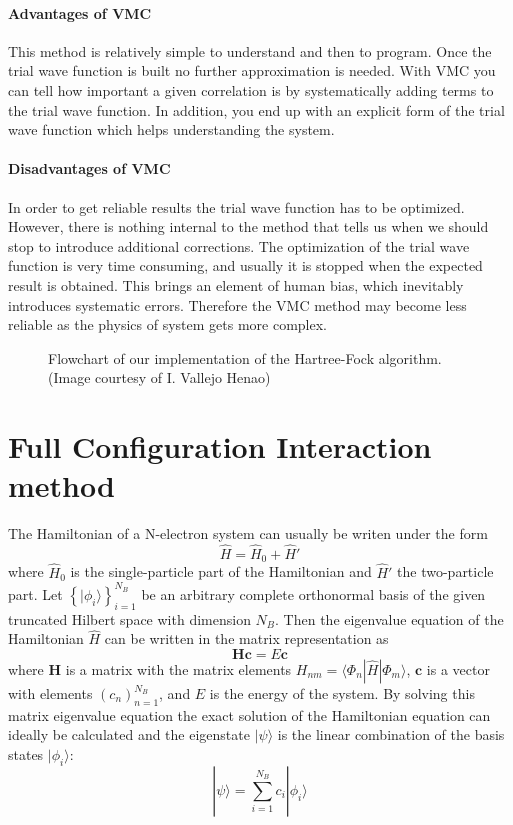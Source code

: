 \paragraph{Advantages of VMC}
This method is relatively simple to understand and then to program. Once the trial wave function is built no further approximation is needed.
With VMC you can tell how important a given correlation is by systematically adding terms to the trial wave function.
In addition, you end up with an explicit form of the trial wave function which helps understanding the system.

\paragraph{Disadvantages of VMC}
In order to get reliable results the trial wave function has to be optimized. However, there is nothing internal to the method that tells us when we should stop to introduce additional corrections.
The optimization of the trial wave function is very time consuming, and usually it is stopped when the expected result is obtained. This brings an element of human bias, which inevitably introduces systematic errors. Therefore the VMC method may become less reliable as the physics of system gets more complex.
\begin{figure}
\centering
\scalebox{1}{}
\caption{\label{fig:diagramHF}Flowchart of our implementation of the Hartree-Fock algorithm.\newline
(Image courtesy of I. Vallejo Henao)}
\end{figure}


\section{Full Configuration Interaction method}

The Hamiltonian of a N-electron system can usually be writen under the form
\begin{equation}
 \hat{H} = \hat{H}_0 + \hat{H}'
\end{equation} 
where $\hat{H}_0$ is the single-particle part of the Hamiltonian and $\hat{H}'$ the two-particle part.
Let $ \left\{ |\phi_i \rangle \right\}^{N_B}_{i=1}$ be an arbitrary complete orthonormal basis of the given truncated Hilbert space with dimension $N_B$. Then the eigenvalue equation of the Hamiltonian $\hat{H}$ can be written in the matrix representation as
\begin{equation}
\label{eq:matrixH}
 \mathbf{Hc} = E \mathbf{c}
\end{equation} 
where $\mathbf{H}$ is a matrix with the matrix elements $H_{nm} = \langle \Phi_n |\hat{H} | \Phi_m \rangle$, $\mathbf{c}$ is a vector with elements $(c_n)^{N_B}_{n=1}$, and $E$ is the energy of the system. By solving this matrix eigenvalue equation the exact solution of the Hamiltonian equation can ideally be calculated and the eigenstate $|\psi \rangle$ is the linear combination of the basis states $|\phi_i \rangle$:
\begin{equation}
 |\psi \rangle = \sum_{i=1}^{N_B} c_i |\phi_i \rangle
\end{equation}


